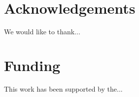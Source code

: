 \documentclass{bioinfo}
\begin{document}
 
\vspace*{-10pt}

\section*{Acknowledgements}
We would like to thank...

\vspace*{-12pt}

\section*{Funding}

This work has been supported by the...

\vspace*{-12pt}



\end{document}
